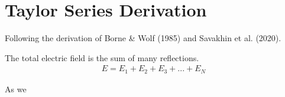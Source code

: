 \documentclass[../main.tex]{subfiles}
\begin{document}
	\section{Taylor Series Derivation}
	Following the derivation of Borne \& Wolf (1985) and Savakhin et al. (2020).
	
	The total electric field is the sum of many reflections.
	\begin{align}
		E = E_1 + E_2 + E_3 + ... + E_N
	\end{align}
	
	As we 

	
	\ifSubfilesClassLoaded{
		\printbibliography{}
		\printglossaries
	}{} %
	
\end{document}
